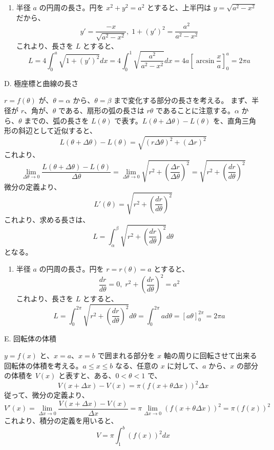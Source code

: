 \begin{eg}
\begin{enumerate}
\item 半径 $a$ の円周の長さ。円を $x^2 + y^2 = a^2$ とすると、上半円は $y = \sqrt{a^2-x^2}$ だから、
$$y' = \frac{-x}{\sqrt{a^2-x^2}}, \; 1+(y')^2 = \frac{a^2}{a^2 - x^2}$$
これより、長さを $L$ とすると、
$$L = 4\int_0^a\sqrt{1+(y')^2}dx = 4\int_0^1\sqrt{\frac{a^2}{a^2-x^2}}dx = 4a\left[\arcsin\frac{x}{a}\right]_0^a = 2\pi a$$
\end{enumerate}
\end{eg}

D. 極座標と曲線の長さ

$r = f(\theta)$ が、$\theta = \alpha$ から、$\theta = \beta$ まで変化する部分の長さを考える。
まず、半径が $r$、角が、$\theta$ である、扇形の弧の長さは $r\theta$ であることに注意する。$\alpha$ から、$\theta$ までの、弧の長さを $L(\theta)$ で表す。$L(\theta + \Delta\theta) - L(\theta)$  を、直角三角形の斜辺として近似すると、
$$L(\theta+\Delta\theta) - L(\theta) = \sqrt{(r\Delta\theta)^2 + (\Delta r)^2}$$
これより、
$$\lim_{\Delta\theta\to 0}\frac{L(\theta+\Delta\theta) - L(\theta)}{\Delta\theta} = \lim_{\Delta\theta\to 0}\sqrt{r^2 + \left(\frac{\Delta r}{\Delta\theta}\right)^2} = \sqrt{r^2 + \left(\frac{dr}{d\theta}\right)^2}$$
微分の定義より、
$$L'(\theta) = \sqrt{r^2 + \left(\frac{dr}{d\theta}\right)^2}$$
これより、求める長さは、
$$L = \int_\alpha^\beta\sqrt{r^2 + \left(\frac{dr}{d\theta}\right)^2}d\theta$$
となる。

\begin{eg}
\begin{enumerate}
\item 半径 $a$ の円周の長さ。円を $r = r(\theta) = a$ とすると、
$$\frac{dr}{d\theta} = 0, \; r^2 + \left(\frac{dr}{d\theta}\right)^2 = a^2$$
これより、長さを $L$ とすると、
$$L = \int_0^{2\pi}\sqrt{r^2 + \left(\frac{dr}{d\theta}\right)^2}d\theta = \int_0^{2\pi}a d\theta = [a\theta]_0^{2\pi} = 2\pi a$$
\end{enumerate}
\end{eg}

E. 回転体の体積

$y = f(x)$ と、$x = a$、$x = b$ で囲まれる部分を $x$ 軸の周りに回転させて出来る回転体の体積を考える。$a\leq x\leq b$ なる、任意の $x$ に対して、$a$ から、$x$ の部分の体積を $V(x)$ と表すと、ある、$0<\theta<1$ で、
$$V(x+\Delta x) - V(x) = \pi(f(x+\theta\Delta x))^2\Delta x$$
従って、微分の定義より、
$$V'(x) = \lim_{\Delta x\to 0}\frac{V(x+\Delta x) - V(x)}{\Delta x} = \pi\lim_{\Delta x\to 0}(f(x+\theta\Delta x))^2 = \pi(f(x))^2$$
これより、積分の定義を用いると、
$$V = \pi\int_1^b(f(x))^2dx$$





